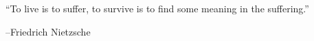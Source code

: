 %
%
%

\chapter*{}


\begin{displayquote}
``To live is to suffer, to survive is to find some meaning in the suffering.''
\end{displayquote}
\hspace{4 in}--Friedrich Nietzsche%

\pagebreak{}
